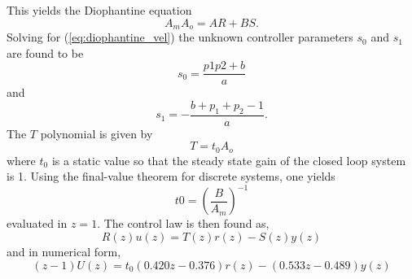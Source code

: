 \documentclass[12pt,a4paper]{article}
\begin{document}
This yields the Diophantine equation
\begin{equation}
    \label{eq:diophantine_vel}
    A_mA_o = AR + BS.
\end{equation}
Solving for (\ref{eq:diophantine_vel}) the unknown controller parameters $s_0$
and $s_1$ are found to be
\begin{equation}
    \label{eq:s0_vel}
    s_0 = \frac{p1p2+b}{a}
\end{equation}
and
\begin{equation}
    \label{eq:s1_vel}
    s_1 = -\frac{b + p_1 + p_2 -1}{a}.
\end{equation}
The $T$ polynomial is given by 
\begin{equation}
    \label{eq:T_vel}
    T = t_0A_o
\end{equation}
where $t_0$ is a static value so that the steady state gain of the closed loop
system is 1. Using the final-value theorem for discrete systems, one yields
\begin{equation}
    \label{eq:t0_vel}
    t0 = \left (\frac{B}{A_m} \right )^{-1}
\end{equation}
evaluated in $z=1$. The control law is then found as,
\begin{equation}
    R(z)u(z)=T(z)r(z)-S(z)y(z)
    \label{eq:contlaw}
\end{equation}
and in numerical form,
\begin{equation}
    (z-1)U(z)=t_0(0.420z-0.376)r(z)-(0.533z - 0.489)y(z)
\end{equation}
\end{document}
